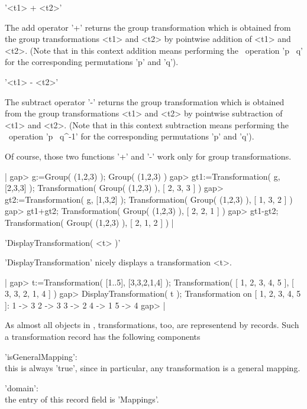 '<t1> + <t2>'

The add operator '+' returns the group transformation which is obtained 
from the group transformations <t1> and <t2> by pointwise addition 
of <t1> and <t2>. (Note that in this context addition means 
performing the \GAP\ operation 'p \*\ q' for the corresponding 
permutations 'p' and 'q').

'<t1> - <t2>'

The subtract operator '-' returns the group transformation which is 
obtained from the group transformations <t1> and <t2> by pointwise 
subtraction of <t1> and <t2>. (Note that in this context subtraction 
means performing the \GAP\ operation 'p \*\ q\^{}-1' for the corresponding 
permutations 'p' and 'q').

Of course, those two functions '+' and '-' work only for group 
transformations.

|  gap> g:=Group( (1,2,3) );
  Group( (1,2,3) )
  gap> gt1:=Transformation( g, [2,3,3] );
  Transformation( Group( (1,2,3) ), [ 2, 3, 3 ] )
  gap> gt2:=Transformation( g, [1,3,2] );
  Transformation( Group( (1,2,3) ), [ 1, 3, 2 ] )
  gap> gt1+gt2;
  Transformation( Group( (1,2,3) ), [ 2, 2, 1 ] )
  gap> gt1-gt2;
  Transformation( Group( (1,2,3) ), [ 2, 1, 2 ] )
|

   
'DisplayTransformation( <t> )'

'DisplayTransformation' nicely displays a transformation <t>.

|  gap> t:=Transformation( [1..5], [3,3,2,1,4] );
  Transformation( [ 1, 2, 3, 4, 5 ], [ 3, 3, 2, 1, 4 ] )
  gap> DisplayTransformation( t );
  Transformation on [ 1, 2, 3, 4, 5 ]:
    1 -> 3
    2 -> 3
    3 -> 2
    4 -> 1
    5 -> 4
  gap>
|  

   
As almost all objects in \GAP{}, transformations, too, are representend by 
records. Such a transformation record has the following components\:

'isGeneralMapping': \\ 
  this is always 'true', since in particular, any transformation is a 
  general mapping. 

'domain': \\               
  the entry of this record field is 'Mappings'.


